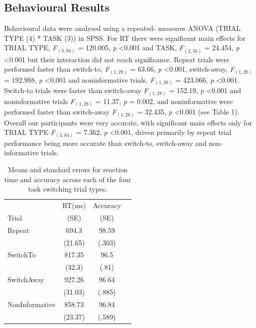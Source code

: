 \documentclass[preprint,authoryear,11pt,5p,times,twocolumns]{elsarticle}
\begin{document}
\subsection{Behavioural Results}
Behavioural data were analysed using a repeated- measures ANOVA (TRIAL TYPE (4) * TASK (3)) in SPSS. For RT there were significant main effects for TRIAL TYPE, \textit{F}$_{(3,84)}$ = 120.005, \textit{p} \textless 0.001 and TASK, \textit{F}$_{(2,56)}$ = 24.454, \textit{p} \textless 0.001 but their interaction did not reach significance. Repeat trials were performed faster than switch-to, \textit{F}$_{(1,28)}$ = 63.66, \textit{p} \textless 0.001, switch-away, \textit{F}$_{(1,28)}$ = 192.988, \textit{p} \textless 0.001 and noninformative trials, \textit{F}$_{(1,28)}$ = 423.066, \textit{p} \textless 0.001. Switch-to trials were faster than switch-away \textit{F}$_{(1,28)}$ = 152.19, \textit{p} \textless 0.001 and noninformative trials \textit{F}$_{(1,28)}$ = 11.37, \textit{p} = 0.002, and noninformative were performed faster than switch-away \textit{F}$_{(1,28)}$ = 32.435, \textit{p} \textless 0.001 (see Table 1).
Overall our participants were very accurate, with significant main effects only for TRIAL TYPE \textit{F}$_{(3,84)}$ = 7.362, \textit{p} \textless 0.001, driven primarily by repeat trial performance being more accurate than switch-to, switch-away and non-informative trials.
\begin{table}[t]
\centering
\begin{tabular}{l c c c}
 & RT(ms) & Accuracy\\
Trial & (SE) & (SE)\\
\hline
Repeat & 694.3&98.59\\
 & (21.65) &(.303) \\
SwitchTo & 817.35&96.5 \\
 & (32.3) & (.81)\\
SwitchAway & 927.26&96.64\\
 & (31.03) & (.885)\\
NonInformative & 858.73&96.84\\
 & (23.37) & (.589)\\
\hline
\end{tabular}
\caption{Means and standard errors for reaction time and accuracy across each of the four task switching trial types.}
\label{tab: template}
\end{table}
\end{document}
